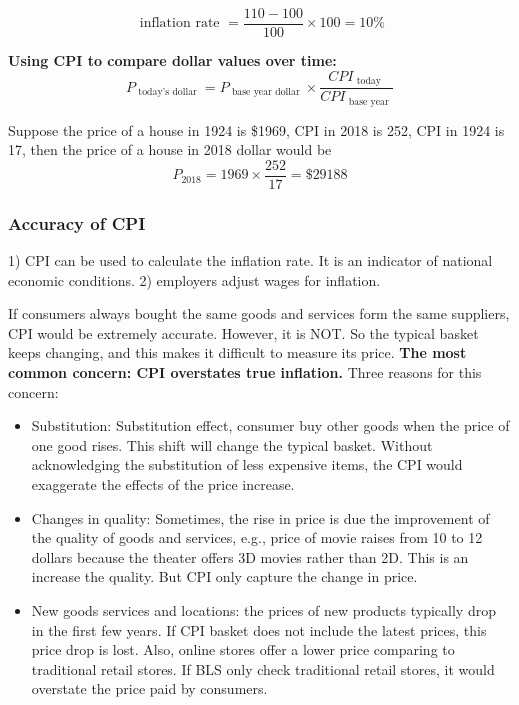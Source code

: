 \documentclass[12pt]{article}
\begin{document}
\begin{equation*}
\text{ inflation rate } = \frac{110 - 100}{100} \times 100 = 10\%
\end{equation*}


{\textbf {Using CPI to compare dollar values over time:}}
\begin{equation*}
P_{\text{ today's dollar }} = P_{\text{ base year dollar }}  \times 
\frac{CPI_{\text{ today }}}{CPI_{\text{ base year }}}
\end{equation*}

Suppose the price of a house in 1924 is \$1969, CPI in 2018 is 252, CPI in 1924 is
17, then the price of a house in 2018 dollar would be 
\begin{equation*}
P_{2018} = 1969  \times \frac{252}{17} = \$29188
\end{equation*}



\subsubsection{Accuracy of CPI}
1) CPI can be used to calculate the inflation rate. It is an indicator of national
economic conditions. 2) employers adjust wages for inflation.


If consumers always bought the same goods and services form the same suppliers, CPI
would be extremely accurate. However, it is NOT.
So the typical basket keeps changing, and this makes it difficult to measure its price.
{\textbf {The most common concern: CPI overstates true inflation.}} Three reasons
for this concern:
\begin{itemize}
\item Substitution: Substitution effect, consumer buy other goods when the price of
		one good rises. This shift will change the typical basket. Without acknowledging
		the substitution of less expensive items, the CPI would exaggerate the effects of
		the price increase.
\item Changes in quality: Sometimes, the rise in price is due the improvement of 
		the quality of goods and services, e.g., price of movie raises from 10 to 12 
		dollars because the theater offers 3D movies rather than 2D. This is an increase
		the quality. But CPI only capture the change in price.
\item New goods services and locations: the prices of new products typically drop
		in the first few years. If CPI basket does not include the latest prices, this
		price drop is lost. Also, online stores offer a lower price comparing to 
		traditional retail stores. If BLS only check traditional retail stores, it would
		overstate the price paid by consumers.
\end{itemize}
\end{document}
